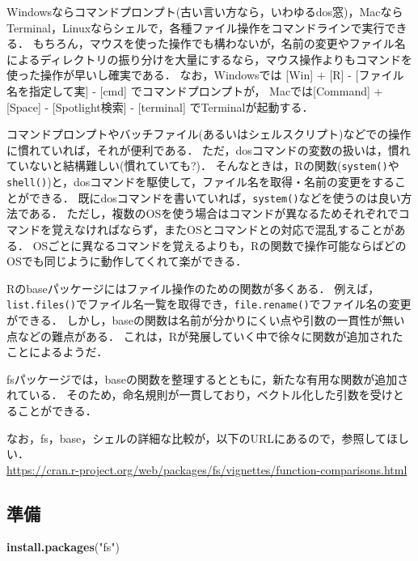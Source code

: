 \documentclass[
]{article}
\newenvironment{Shaded}{\begin{snugshade}}{\end{snugshade}}
\newcommand{\FunctionTok}[1]{\textcolor[rgb]{0.13,0.29,0.53}{\textbf{#1}}}
\newcommand{\NormalTok}[1]{#1}
\newcommand{\StringTok}[1]{\textcolor[rgb]{0.31,0.60,0.02}{#1}}
\begin{document}
Windowsならコマンドプロンプト(古い言い方なら，いわゆるdos窓)，MacならTerminal，Linuxならシェルで，各種ファイル操作をコマンドラインで実行できる．
もちろん，マウスを使った操作でも構わないが，名前の変更やファイル名によるディレクトリの振り分けを大量にするなら，マウス操作よりもコマンドを使った操作が早いし確実である．
なお，Windowsでは {[}Win{]} + {[}R{]} - {[}ファイル名を指定して実{]} - {[}cmd{]} でコマンドプロンプトが，
Macでは{[}Command{]} + {[}Space{]} - {[}Spotlight検索{]} - {[}terminal{]} でTerminalが起動する．

コマンドプロンプトやバッチファイル(あるいはシェルスクリプト)などでの操作に慣れていれば，それが便利である．
ただ，dosコマンドの変数の扱いは，慣れていないと結構難しい(慣れていても?)．
そんなときは，Rの関数(\texttt{system()}や\texttt{shell()})と，dosコマンドを駆使して，ファイル名を取得・名前の変更をすることができる．
既にdosコマンドを書いていれば，\texttt{system()}などを使うのは良い方法である．
ただし，複数のOSを使う場合はコマンドが異なるためそれぞれでコマンドを覚えなければならず，またOSとコマンドとの対応で混乱することがある．
OSごとに異なるコマンドを覚えるよりも，Rの関数で操作可能ならばどのOSでも同じように動作してくれて楽ができる．

Rのbaseパッケージにはファイル操作のための関数が多くある．
例えば，\texttt{list.files()}でファイル名一覧を取得でき，\texttt{file.rename()}でファイル名の変更ができる．
しかし，baseの関数は名前が分かりにくい点や引数の一貫性が無い点などの難点がある．
これは，Rが発展していく中で徐々に関数が追加されたことによるようだ．

fsパッケージでは，baseの関数を整理するとともに，新たな有用な関数が追加されている．
そのため，命名規則が一貫しており，ベクトル化した引数を受けとることができる．

なお，fs，base，シェルの詳細な比較が，以下のURLにあるので，参照してほしい．\\
\url{https://cran.r-project.org/web/packages/fs/vignettes/function-comparisons.html}

\hypertarget{ux6e96ux5099-4}{%
\subsection{準備}\label{ux6e96ux5099-4}}

\begin{Shaded}
\begin{Highlighting}[]
\FunctionTok{install.packages}\NormalTok{(}\StringTok{"fs"}\NormalTok{)}
\end{Highlighting}
\end{Shaded}
\end{document}
